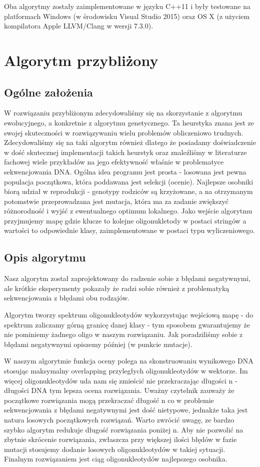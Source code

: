 \documentclass{article}
\begin{document}

Oba algorytmy zostały zaimplementowane w języku C++11 i były testowane na platformach Windows (w środowisku Visual Studio 2015) oraz OS X (z użyciem kompilatora Apple LLVM/Clang w wersji 7.3.0). 

\section{Algorytm przybliżony}
\subsection{Ogólne założenia}
W rozwiązaniu przybliżonym zdecydowaliśmy się na skorzystanie z algorytmu ewolucyjnego, a konkretnie z algorytmu genetycznego. Ta heurstyka znana jest ze swojej skuteczności w rozwiązywaniu wielu problemów obliczeniowo trudnych. Zdecydowaliśmy się na taki algorytm również dlatego że posiadamy doświadczenie w dość skutecznej implementacji takich heurstyk oraz znaleźliśmy w literaturze fachowej wiele przykładów na jego efektywność właśnie w problematyce sekwencjowania DNA. Ogólna idea programu jest prosta - losowana jest pewna populacja początkowa, która poddawana jest selekcji (ocenie). Najlepsze osobniki biorą udział w reprodukcji - genotypy rodziców są krzyżowane, a na otrzymanym potomstwie przeprowadzana jest mutacja, która ma za zadanie zwiększyć różnorodność i wyjść z ewentualnego optimum lokalnego. Jako wejście algorytmu przyjmujemy mapę gdzie klucze to kolejne oligonukletody w postaci stringów a wartości to odpowiednie klasy, zaimplementowane w postaci typu wyliczeniowego.

\subsection{Opis algorytmu}
Nasz algorytm został zaprojektowany do radzenie sobie z błędami negatywnymi, ale krótkie eksperymenty pokazały że radzi sobie również z problematyką sekwencjowania z błędami obu rodzajów.

Algorytm tworzy spektrum oligonukleotydów wykorzystując wejściową mapę -  do spektrum zaliczamy górną granicę danej klasy - tym sposobem gwarantujemy że nie pominiemy żadnego oligo w naszym rozwiązaniu. Jak poradziliśmy sobie z błędami negatywnymi opiszemy później (w punkcie mutacje). 

W naszym algorytmie funkcja oceny polega na skonstruowaniu wynikowego DNA stosując maksymalny overlapping przyległych oligonukleotydów w wektorze. Im więcej oligonukleotydów uda nam się zmieścić nie przekraczając długości n - długości DNA tym lepsza ocena rozwiązania. Uważny czytelnik zauważy że początkowe rozwiązania mogą przekraczać długość n co w problemie sekwencjowania z błędami negatywnymi jest dość nietypowe, jednakże taka jest natura losowych początkowych rozwiązań. Warto zwrócić uwagę, ze bardzo szybko algorytm redukuje długość rozwiązania poniżej n. Aby nie pozwolić na zbytnie skrócenie rozwiązania, zwłaszcza przy większej ilości błędów w fazie mutacji stosujemy dodanie losowych oligonukleotydów w takiej sytuacji. Finalnym rozwiązaniem jest ciąg oligonukleotydów najlepszego osobnika.
\end{document}

